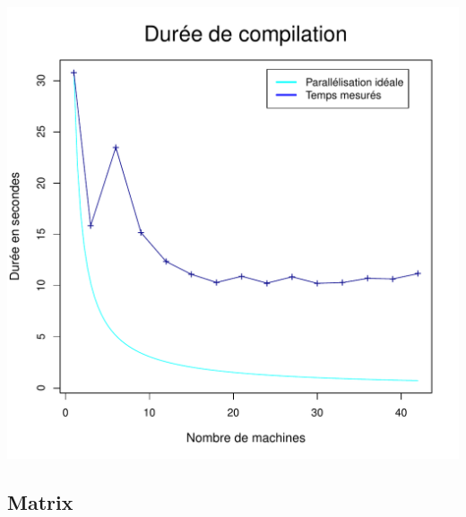\documentclass[a4paper, 11pt, titlepage]{article}
\begin{document}
\begin{center}
    \includegraphics[scale=0.6]{res/sujet_makefiles_blender_259_Makefile_nth8.pdf}
\end{center}



\subsection {Matrix}
\end{document}
